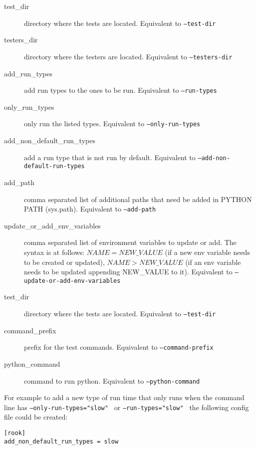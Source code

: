 \documentclass{article}
\begin{document}
\begin{description}
\item[test\_dir] directory where the tests are located.  Equivalent to {\tt --test-dir}
\item[testers\_dir] directory where the testers are located. Equivalent to {\tt --testers-dir}
\item[add\_run\_types] add run types to the ones to be run. Equivalent to {\tt --run-types}
\item[only\_run\_types] only run the listed types. Equivalent to {\tt --only-run-types}
\item[add\_non\_default\_run\_types] add a run type that is not run by default. Equivalent to {\tt --add-non-default-run-types}
\item[add\_path] comma separated list of additional paths that need be added in PYTHON PATH (sys.path).  Equivalent to {\tt --add-path}
\item[update\_or\_add\_env\_variables] comma separated list of environment variables to update or add.
The syntax is at follows: $NAME=NEW\_VALUE$ (if a new env variable needs to be created or updated),
$NAME>NEW\_VALUE$ (if an env variable needs to be updated appending NEW\_VALUE to it).  Equivalent to {\tt --update-or-add-env-variables}
\item[test\_dir] directory where the tests are located.  Equivalent to {\tt --test-dir}
\item[command\_prefix] prefix for the test commands.  Equivalent to {\tt --command-prefix}
\item[python\_command] command to run python. Equivalent to {\tt --python-command}
\end{description}

For example to add a new type of run time that only runs when the command line has {\tt --only-run-types="slow" } or {\tt --run-types="slow" } the following config file could be created:

\begin{verbatim}
[rook]
add_non_default_run_types = slow
\end{verbatim}
\end{document}
